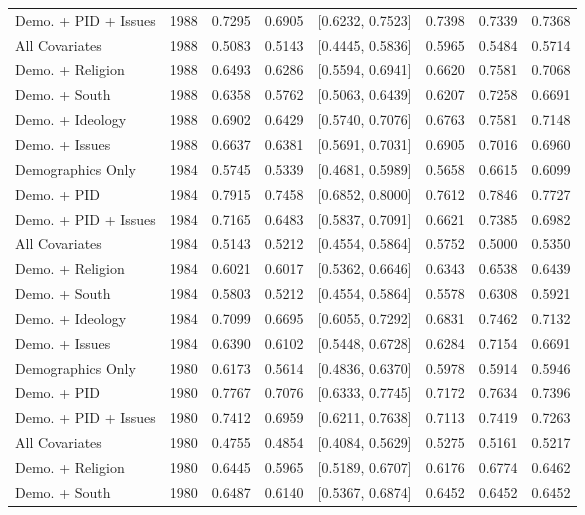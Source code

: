 \begin{longtable}{lrrrlrrr}
  Demo. + PID + Issues & 1988 & 0.7295 & 0.6905 & [0.6232, 0.7523] & 0.7398 & 0.7339 & 0.7368 \\ 
  All Covariates & 1988 & 0.5083 & 0.5143 & [0.4445, 0.5836] & 0.5965 & 0.5484 & 0.5714 \\ 
  Demo. + Religion & 1988 & 0.6493 & 0.6286 & [0.5594, 0.6941] & 0.6620 & 0.7581 & 0.7068 \\ 
  Demo. + South & 1988 & 0.6358 & 0.5762 & [0.5063, 0.6439] & 0.6207 & 0.7258 & 0.6691 \\ 
  Demo. + Ideology & 1988 & 0.6902 & 0.6429 & [0.5740, 0.7076] & 0.6763 & 0.7581 & 0.7148 \\ 
  Demo. + Issues & 1988 & 0.6637 & 0.6381 & [0.5691, 0.7031] & 0.6905 & 0.7016 & 0.6960 \\ 
  Demographics Only & 1984 & 0.5745 & 0.5339 & [0.4681, 0.5989] & 0.5658 & 0.6615 & 0.6099 \\ 
  Demo. + PID & 1984 & 0.7915 & 0.7458 & [0.6852, 0.8000] & 0.7612 & 0.7846 & 0.7727 \\ 
  Demo. + PID + Issues & 1984 & 0.7165 & 0.6483 & [0.5837, 0.7091] & 0.6621 & 0.7385 & 0.6982 \\ 
  All Covariates & 1984 & 0.5143 & 0.5212 & [0.4554, 0.5864] & 0.5752 & 0.5000 & 0.5350 \\ 
  Demo. + Religion & 1984 & 0.6021 & 0.6017 & [0.5362, 0.6646] & 0.6343 & 0.6538 & 0.6439 \\ 
  Demo. + South & 1984 & 0.5803 & 0.5212 & [0.4554, 0.5864] & 0.5578 & 0.6308 & 0.5921 \\ 
  Demo. + Ideology & 1984 & 0.7099 & 0.6695 & [0.6055, 0.7292] & 0.6831 & 0.7462 & 0.7132 \\ 
  Demo. + Issues & 1984 & 0.6390 & 0.6102 & [0.5448, 0.6728] & 0.6284 & 0.7154 & 0.6691 \\ 
  Demographics Only & 1980 & 0.6173 & 0.5614 & [0.4836, 0.6370] & 0.5978 & 0.5914 & 0.5946 \\ 
  Demo. + PID & 1980 & 0.7767 & 0.7076 & [0.6333, 0.7745] & 0.7172 & 0.7634 & 0.7396 \\ 
  Demo. + PID + Issues & 1980 & 0.7412 & 0.6959 & [0.6211, 0.7638] & 0.7113 & 0.7419 & 0.7263 \\ 
  All Covariates & 1980 & 0.4755 & 0.4854 & [0.4084, 0.5629] & 0.5275 & 0.5161 & 0.5217 \\ 
  Demo. + Religion & 1980 & 0.6445 & 0.5965 & [0.5189, 0.6707] & 0.6176 & 0.6774 & 0.6462 \\ 
  Demo. + South & 1980 & 0.6487 & 0.6140 & [0.5367, 0.6874] & 0.6452 & 0.6452 & 0.6452 \\ 

\end{longtable}
